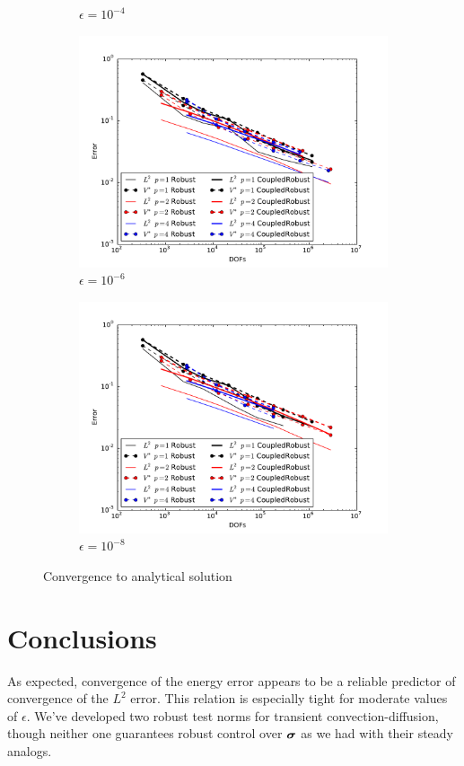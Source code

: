 \documentclass{article}
\theoremstyle{definition}
\theoremstyle{remark}
\begin{document}
\begin{figure}[ht]
\begin{subfigure}[t]{0.45\textwidth}
\caption{$\epsilon=10^{-4}$}
\end{subfigure}
\begin{subfigure}[t]{0.45\textwidth}
\centering
\includegraphics[width=\textwidth]{Confusion/Robustness/convergence_epsilon=1e-6.pdf}
\caption{$\epsilon=10^{-6}$}
\end{subfigure}
\begin{subfigure}[t]{0.45\textwidth}
\centering
\includegraphics[width=\textwidth]{Confusion/Robustness/convergence_epsilon=1e-8.pdf}
\caption{$\epsilon=10^{-8}$}
\end{subfigure}
\caption{Convergence to analytical solution}
\label{fig:robustConvergence}
\end{figure}


\section{Conclusions}
As expected, convergence of the energy error appears to be a reliable predictor of convergence of the $L^2$ error. 
This relation is especially tight for moderate values of $\epsilon$. 
We've developed two robust test norms for transient convection-diffusion, though neither one guarantees robust control over $\boldsymbol\sigma$ as we had
with their steady analogs. 

%  
 

\end{document}
